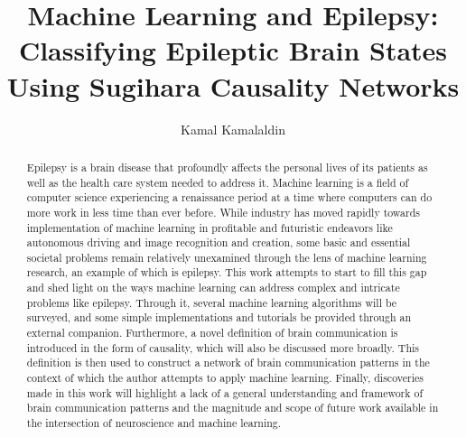 \documentclass[journal,12pt,onecolumn,draftclsnofoot]{IEEEtran}  %
\title{Machine Learning and Epilepsy: Classifying Epileptic Brain States Using Sugihara Causality Networks}
\author{Kamal Kamalaldin}
\begin{document}
\maketitle

\thispagestyle{empty}
\cleardoublepage

\tableofcontents

\thispagestyle{empty}
\cleardoublepage


\begin{abstract}
Epilepsy is a brain disease that profoundly affects the personal lives of its patients as well as the health care system needed to address it. Machine learning is a field of computer science experiencing a renaissance period at a time where computers can do more work in less time than ever before. While industry has moved rapidly towards  implementation of machine learning in profitable and futuristic endeavors like autonomous driving and image recognition and creation, some basic and essential societal problems remain relatively unexamined through the lens of machine learning research, an example of which is epilepsy. This work attempts to start to fill this gap and shed light on the ways machine learning can address complex and intricate problems like epilepsy. Through it, several machine learning algorithms will be surveyed, and some simple implementations and tutorials be provided through an external companion. Furthermore, a novel definition of brain communication is introduced in the form of causality, which will also be discussed more broadly. This definition is then used to construct a network of brain communication patterns in the context of which the author attempts to apply machine learning. Finally, discoveries made in this work will highlight a lack of a general understanding and framework of brain communication patterns and the magnitude and scope of future work available in the intersection of neuroscience and machine learning.
\end{abstract}


\clearpage

\clearpage



\clearpage

\clearpage

\end{document}
